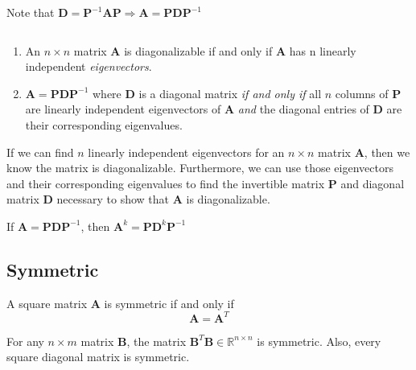 Note that $\bm{D}=\bm{P}^{-1}\bm{A}\bm{P}\Longrightarrow \bm{A}=\bm{P}\bm{D}\bm{P}^{-1}$

\begin{theorem} ${\ }$

\begin{enumerate}[label=\alph*)]
    \item An $n\times n$ matrix $\bm{A}$ is diagonalizable if and only if $\bm{A}$ has n linearly independent \emph{eigenvectors}.
    \item  $\bm{A}=\bm{PDP}^{-1}$ where $\bm{D}$ is a diagonal matrix \emph{if and only if} all $n$ columns of $\bm{P}$ are linearly independent
eigenvectors of $\bm{A}$ \emph{and} the diagonal entries of $\bm{D}$ are their corresponding eigenvalues.
\end{enumerate}
\end{theorem}
If we can find $n$ linearly independent eigenvectors for an $n\times n$
matrix $\bm{A}$, then we know the matrix is diagonalizable. Furthermore, we can use those eigenvectors and their corresponding eigenvalues to find the invertible matrix $\bm{P}$ and diagonal matrix $\bm{D}$ necessary to show that $\bm{A}$ is diagonalizable.

\begin{theorem}
If $\bm{A}=\bm{P}\bm{D}\bm{P}^{-1}$, then $\bm{A}^k=\bm{P}\bm{D}^k\bm{P}^{-1}$
\end{theorem}

\subsection{Symmetric}
\begin{definition}
A square matrix $\bm{A}$ is symmetric if and only if
\begin{equation}
    \bm{A}=\bm{A}^T
\end{equation}
\end{definition}
For any $n\times m$ matrix $\bm{B}$, the matrix $\bm{B}^T\bm{B}\in\mathbb{R}^{n\times n}$ is symmetric. Also, every square diagonal matrix is symmetric.

